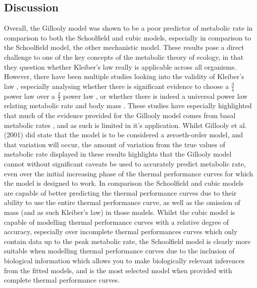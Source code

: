 \documentclass[11pt]{article}
\begin{document}
\begin{linenumbers}
\section{Discussion}
Overall, the Gillooly model was shown to be a poor predictor of metabolic rate in comparison to both the Schoolfield and cubic models, especially in comparison to the Schoolfield model, the other mechanistic model. These results pose a direct challenge to one of the key concepts of the metabolic theory of ecology, in that they question whether Kleiber's law really is applicable across all organisms. However, there have been multiple studies looking into the validity of Kleiber's law \citep{White2012,Kontopoulos2018}, especially analysing whether there is significant evidence to choose a $\frac{3}{4}$ power law over a $\frac{2}{3}$ power law \citep{Hudson2013, Hulbert2014, Dodds2001}, or whether there is indeed a universal power law relating metabolic rate and body mass \citep{Downs2008}. These studies have especially highlighted that much of the evidence provided for the Gillooly model comes from basal metabolic rates \citep{Hudson2013}, and as such is limited in it's application. Whilst Gillooly et al. (2001) did state that the model is to be considered a zeroeth-order model, and that variation will occur, the amount of variation from the true values of metabolic rate displayed in these results highlights that the Gillooly model cannot without significant caveats be used to accurately predict metabolic rate, even over the initial increasing phase of the thermal performance curves for which the model is designed to work.
In comparison the Schoolfield and cubic models are capable of better predicting the thermal performance curves due to their ability to use the entire thermal performance curve, as well as the omission of mass (and as such Kleiber's law) in those models. Whilst the cubic model is capable of modelling thermal performance curves with a relative degree of accuracy, especially over incomplete thermal performances curves which only contain data up to the peak metabolic rate, the Schoolfield model is clearly more suitable when modelling thermal performance curves due to the inclusion of biological information which allows you to make biologically relevant inferences from the fitted models, and is the most selected model when provided with complete thermal performance curves.


\end{linenumbers}
\end{document}
